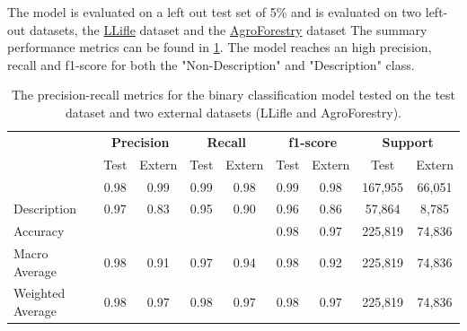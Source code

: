 \documentclass[a4paper, 12pt, oneside]{book} %
\begin{document}
The model is evaluated on a left out test set of 5\% and is evaluated on two left-out datasets, the \href{http://www.llifle.com/}{LLifle} dataset and the \href{https://www.worldagroforestry.org/}{AgroForestry} dataset
The summary performance metrics can be found in \ref{tab:precision_recall_metrics}.
The model reaches an high precision, recall and f1-score for both the "Non-Description" and "Description" class.
\begin{table}[ht]
\centering
\caption[Precision-recall metrics for the test dataset and the two left out datasets]{The precision-recall metrics for the binary classification model tested on the test dataset and two external datasets (LLifle and AgroForestry).}
\label{tab:precision_recall_metrics}
\begin{tabular}{@{}lcccccccc@{}}
\cmidrule(l){2-9}
 & \multicolumn{2}{c}{\textbf{Precision}} & \multicolumn{2}{c}{\textbf{Recall}} & \multicolumn{2}{c}{\textbf{f1-score}} & \multicolumn{2}{c}{\textbf{Support}} \\ \cmidrule(l){2-9} 
                 & Test & Extern & Test & Extern & Test & Extern & Test    & Extern \\ \midrule
                 & 0.98 & 0.99   & 0.99 & 0.98   & 0.99 & 0.98   & 167,955 & 66,051 \\
Description      & 0.97 & 0.83   & 0.95 & 0.90   & 0.96 & 0.86   & 57,864  & 8,785  \\ \midrule
Accuracy         &      &        &      &        & 0.98 & 0.97   & 225,819 & 74,836 \\
Macro Average    & 0.98 & 0.91   & 0.97 & 0.94   & 0.98 & 0.92   & 225,819 & 74,836 \\
Weighted Average & 0.98 & 0.97   & 0.98 & 0.97   & 0.98 & 0.97   & 225,819 & 74,836 \\ \bottomrule
\end{tabular}
\end{table}
\end{document}

